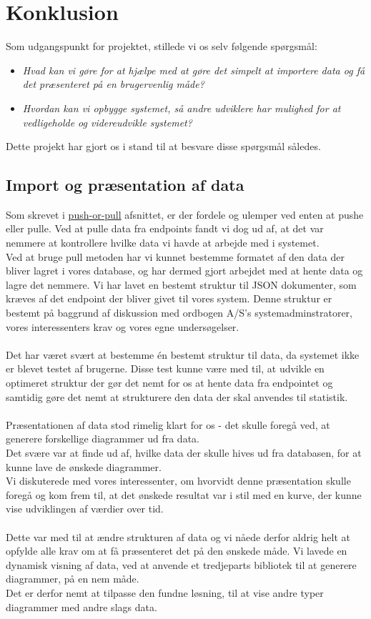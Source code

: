 \hypertarget{konklusion}{}
\section{Konklusion}
Som udgangspunkt for projektet, stillede vi os selv følgende spørgsmål:
\begin{itemize}
    \item{\textit{Hvad kan vi gøre for at hjælpe med at gøre det simpelt at importere data og få det præsenteret på en brugervenlig måde?}}
    \item{\textit{Hvordan kan vi opbygge systemet, så andre udviklere har mulighed for at vedligeholde og videreudvikle systemet?}}
\end{itemize}
Dette projekt har gjort os i stand til at besvare disse spørgsmål således.
\subsection{Import og præsentation af data}
Som skrevet i \hyperlink{push-or-pull}{push-or-pull} afsnittet, er der fordele og ulemper ved enten at pushe
eller pulle. Ved at pulle data fra endpoints fandt vi dog ud af, at det var nemmere at kontrollere hvilke data vi havde at arbejde
med i systemet.
\\
Ved at bruge pull metoden har vi kunnet bestemme formatet af den data der bliver lagret i vores database, og har dermed gjort arbejdet med at hente data og lagre det nemmere.
Vi har lavet en bestemt struktur til JSON dokumenter, som kræves af det endpoint der bliver givet til vores system.
Denne struktur er bestemt på baggrund af diskussion med ordbogen A/S's systemadminstratorer, vores interessenters krav og vores egne undersøgelser.
\\\\
Det har været svært at bestemme én bestemt struktur til data, da systemet ikke er blevet testet af brugerne.
Disse test kunne være med til, at udvikle en optimeret struktur der gør det nemt for os at hente data fra endpointet
og samtidig gøre det nemt at strukturere den data der skal anvendes til statistik.
\\\\
Præsentationen af data stod rimelig klart for os - det skulle foregå ved, at generere forskellige diagrammer ud fra data.
\\
Det svære var at finde ud af, hvilke data der skulle hives ud fra databasen, for at kunne lave de ønskede diagrammer.
\\
Vi diskuterede med vores interessenter, om hvorvidt denne præsentation skulle foregå og kom frem til, at det ønskede resultat
var i stil med en kurve, der kunne vise udviklingen af værdier over tid.
\\\\
Dette var med til at ændre strukturen af data og vi nåede derfor aldrig helt at opfylde alle krav om at få præsenteret
det på den ønskede måde.
Vi lavede en dynamisk visning af data, ved at anvende et tredjeparts bibliotek til at generere diagrammer, på en nem måde.
\\
Det er derfor nemt at tilpasse den fundne løsning, til at vise andre typer diagrammer med andre slags data.
